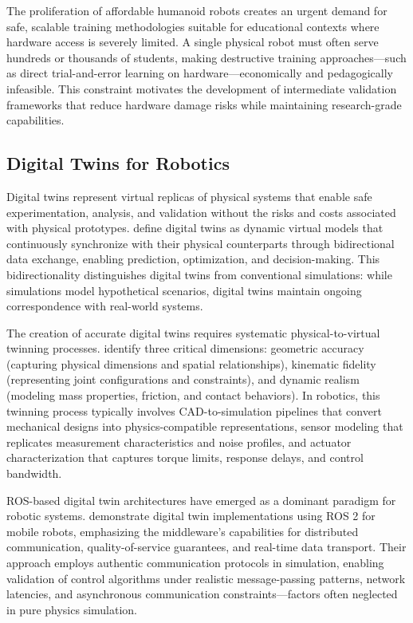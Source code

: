 \documentclass[12pt,a4paper]{article}
\begin{document}
The proliferation of affordable humanoid robots creates an urgent demand for safe, scalable training methodologies suitable for educational contexts where hardware access is severely limited. A single physical robot must often serve hundreds or thousands of students, making destructive training approaches—such as direct trial-and-error learning on hardware—economically and pedagogically infeasible. This constraint motivates the development of intermediate validation frameworks that reduce hardware damage risks while maintaining research-grade capabilities.

\subsection{Digital Twins for Robotics}

Digital twins represent virtual replicas of physical systems that enable safe experimentation, analysis, and validation without the risks and costs associated with physical prototypes. \textcite{hasan2023decoding} define digital twins as dynamic virtual models that continuously synchronize with their physical counterparts through bidirectional data exchange, enabling prediction, optimization, and decision-making. This bidirectionality distinguishes digital twins from conventional simulations: while simulations model hypothetical scenarios, digital twins maintain ongoing correspondence with real-world systems.

The creation of accurate digital twins requires systematic physical-to-virtual twinning processes. \textcite{sturm2021creation} identify three critical dimensions: geometric accuracy (capturing physical dimensions and spatial relationships), kinematic fidelity (representing joint configurations and constraints), and dynamic realism (modeling mass properties, friction, and contact behaviors). In robotics, this twinning process typically involves CAD-to-simulation pipelines that convert mechanical designs into physics-compatible representations, sensor modeling that replicates measurement characteristics and noise profiles, and actuator characterization that captures torque limits, response delays, and control bandwidth.

ROS-based digital twin architectures have emerged as a dominant paradigm for robotic systems. \textcite{digitaltwinros2023development} demonstrate digital twin implementations using ROS 2 for mobile robots, emphasizing the middleware's capabilities for distributed communication, quality-of-service guarantees, and real-time data transport. Their approach employs authentic communication protocols in simulation, enabling validation of control algorithms under realistic message-passing patterns, network latencies, and asynchronous communication constraints—factors often neglected in pure physics simulation.
\end{document}

